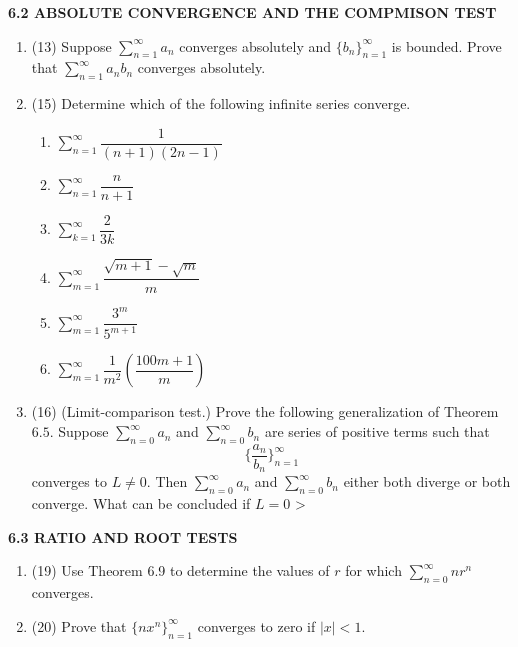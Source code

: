 \documentclass[fleqn]{article}
\begin{document}
  \textbf{6.2 ABSOLUTE CONVERGENCE AND THE COMPMISON TEST}
  \begin{enumerate}
    \item (13) Suppose $\sum\limits_{n=1}^{\infty} a_n$ converges absolutely and $\{ b_n \}_{n=1}^{\infty}$ is bounded.
    Prove that $\sum\limits_{n=1}^{\infty} a_n b_n$ converges absolutely.

    \item (15) Determine which of the following infinite series converge.
    \begin{enumerate}
      \item $\sum\limits_{n=1}^{\infty} \dfrac{1}{(n+1)(2n-1)}$

      \item $\sum\limits_{n=1}^{\infty} \dfrac{n}{n+1}$

      \item $\sum\limits_{k=1}^{\infty} \dfrac{2}{3k}$

      \item $\sum\limits_{m=1}^{\infty} \dfrac{\sqrt{m+1}-\sqrt{m}}{m}$

      \item $\sum\limits_{m=1}^{\infty} \dfrac{3^m}{5^{m+1}}$

      \item $\sum\limits_{m=1}^{\infty} \dfrac{1}{m^2} \left(\dfrac{100m+1}{m}\right)$
    \end{enumerate}

    \item (16) (Limit-comparison test.) Prove the following generalization of Theorem $6.5$. Suppose
    $\sum\limits_{n=0}^{\infty} a_n$ and $\sum\limits_{n=0}^{\infty} b_n$ are series of positive terms such that 
    $$\{ \dfrac{a_n}{b_n} \}_{n=1}^{\infty}$$
    converges to $L\neq 0$. Then $\sum\limits_{n=0}^{\infty} a_n$ and $\sum\limits_{n=0}^{\infty} b_n$  either both diverge or both converge.
    What can be concluded if $L=0$ >
 
  \end{enumerate}


  \textbf{6.3 RATIO AND ROOT TESTS}
  \begin{enumerate}
    \item (19) Use Theorem 6.9 to determine the values of $r$ for which $\sum\limits_{n=0}^{\infty} n r^n$ converges.

    \item (20) Prove that $\{ n x^n\}_{n=1}^{\infty}$ converges to zero if $|x| < 1$.

  \end{enumerate}
\end{document}
